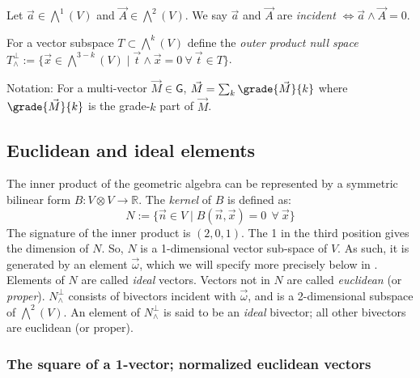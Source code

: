 \documentclass[12pt]{article}
\newcommand{\vsp}{V\xspace}
\begin{document}
\begin{compactenum}[$\bullet$]
\item Let $\vec{a}\in \bigwedge^{1}({V})$ and $\vec{A} \in \bigwedge^{2}({V})$.   We say $\vec{a}$ and $\vec{A}$ are \emph{incident} $\iff \vec{a} \wedge \vec{A}= 0$.
\item For a vector subspace ${T} \subset \bigwedge^{k}({V})$ define the \emph{outer product null space} ${T}_{\wedge}^{\perp} := \{\vec{x} \in \bigwedge^{3-k}({V})\mid \vec{t} \wedge \vec{x} = 0~ \forall~\vec{t} \in {T}\}$.%
\item Notation: For a multi-vector $\vec{M} \in \textsf{G}$, $\vec{M} = \sum_{k}\grade{\vec{M}}{k}$ where $\grade{\vec{M}}{k}$ is the grade-$k$ part of $\vec{M}$.
\end{compactenum}

\subsection{Euclidean and ideal elements}  
The inner product of the geometric algebra can be represented by a symmetric bilinear form $B : \vsp \otimes \vsp\rightarrow \mathbb{R}$. 
The \emph{kernel} of $B$ is defined as:  \[N := \{\vec{n} \in \vsp \mid B(\vec{n},\vec{x}) = 0~~\forall ~\vec{x}\}\]   
The signature of the inner product is $(2,0,1)$.  The 1 in the third position gives the dimension of $N$.  So, $N$ is a 1-dimensional vector sub-space of $\vsp$.  As such, it is generated by an element $\vec{\omega}$, which we will specify more precisely below in .  Elements of $N$ are called \emph{ideal} vectors. %
Vectors not in $N$ are called \emph{euclidean} (or \emph{proper}).  $N^{\perp}_{\wedge}$ consists of bivectors incident with $\vec{\omega}$, and is a 2-dimensional subspace of $\bigwedge^{2}(\vsp)$.  %
An element of $N^{\perp}_{\wedge}$ is said to be an \emph{ideal} bivector; all other bivectors are euclidean (or proper).

\subsubsection{The square of a 1-vector; normalized euclidean vectors}
\end{document}
